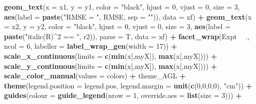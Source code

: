 \documentclass[
]{article}
\newenvironment{Shaded}{\begin{snugshade}}{\end{snugshade}}
\newcommand{\DataTypeTok}[1]{\textcolor[rgb]{0.13,0.29,0.53}{#1}}
\newcommand{\DecValTok}[1]{\textcolor[rgb]{0.00,0.00,0.81}{#1}}
\newcommand{\KeywordTok}[1]{\textcolor[rgb]{0.13,0.29,0.53}{\textbf{#1}}}
\newcommand{\NormalTok}[1]{#1}
\newcommand{\OperatorTok}[1]{\textcolor[rgb]{0.81,0.36,0.00}{\textbf{#1}}}
\newcommand{\StringTok}[1]{\textcolor[rgb]{0.31,0.60,0.02}{#1}}
\begin{document}
\begin{Shaded}
\begin{Highlighting}[]
{{{{{{{{{{\StringTok{    }\KeywordTok{geom_text}\NormalTok{(}\DataTypeTok{x =}\NormalTok{ x1, }\DataTypeTok{y =}\NormalTok{ y1, }\DataTypeTok{color =} \StringTok{"black"}\NormalTok{, }\DataTypeTok{hjust =} \DecValTok{0}\NormalTok{, }\DataTypeTok{vjust =} \DecValTok{0}\NormalTok{, }\DataTypeTok{size =} \DecValTok{3}\NormalTok{,}
              \KeywordTok{aes}\NormalTok{(}\DataTypeTok{label =} \KeywordTok{paste}\NormalTok{(}\StringTok{"RMSE = "}\NormalTok{, RMSE, }\DataTypeTok{sep =} \StringTok{""}\NormalTok{)), }\DataTypeTok{data =}\NormalTok{ xf) }\OperatorTok{+}
\StringTok{    }\KeywordTok{geom_text}\NormalTok{(}\DataTypeTok{x =}\NormalTok{ x2, }\DataTypeTok{y =}\NormalTok{ y2, }\DataTypeTok{color =} \StringTok{"black"}\NormalTok{, }\DataTypeTok{hjust =} \DecValTok{0}\NormalTok{, }\DataTypeTok{vjust =} \DecValTok{0}\NormalTok{, }\DataTypeTok{size =} \DecValTok{3}\NormalTok{,}
              \KeywordTok{aes}\NormalTok{(}\DataTypeTok{label =} \KeywordTok{paste}\NormalTok{(}\StringTok{"italic(R)^2 == "}\NormalTok{, r2)), }\DataTypeTok{parse =}\NormalTok{ T, }\DataTypeTok{data =}\NormalTok{ xf) }\OperatorTok{+}
\StringTok{    }\KeywordTok{facet_wrap}\NormalTok{(Expt }\OperatorTok{~}\StringTok{ }\NormalTok{., }\DataTypeTok{ncol =} \DecValTok{6}\NormalTok{, }\DataTypeTok{labeller =} \KeywordTok{label_wrap_gen}\NormalTok{(}\DataTypeTok{width =} \DecValTok{17}\NormalTok{)) }\OperatorTok{+}\StringTok{ }
\StringTok{    }\KeywordTok{scale_x_continuous}\NormalTok{(}\DataTypeTok{limits =} \KeywordTok{c}\NormalTok{(}\KeywordTok{min}\NormalTok{(x[,myX]), }\KeywordTok{max}\NormalTok{(x[,myX]))) }\OperatorTok{+}
\StringTok{    }\KeywordTok{scale_y_continuous}\NormalTok{(}\DataTypeTok{limits =} \KeywordTok{c}\NormalTok{(}\KeywordTok{min}\NormalTok{(x[,myX]), }\KeywordTok{max}\NormalTok{(x[,myX]))) }\OperatorTok{+}
\StringTok{    }\KeywordTok{scale_color_manual}\NormalTok{(}\DataTypeTok{values =}\NormalTok{ colors) }\OperatorTok{+}
\StringTok{    }\NormalTok{theme_AGL }\OperatorTok{+}\StringTok{ }
\StringTok{    }\KeywordTok{theme}\NormalTok{(}\DataTypeTok{legend.position =}\NormalTok{ legend.pos, }\DataTypeTok{legend.margin =} \KeywordTok{unit}\NormalTok{(}\KeywordTok{c}\NormalTok{(}\DecValTok{0}\NormalTok{,}\DecValTok{0}\NormalTok{,}\DecValTok{0}\NormalTok{,}\DecValTok{0}\NormalTok{), }\StringTok{"cm"}\NormalTok{)) }\OperatorTok{+}
\StringTok{    }\KeywordTok{guides}\NormalTok{(}\DataTypeTok{colour =} \KeywordTok{guide_legend}\NormalTok{(}\DataTypeTok{nrow =} \DecValTok{1}\NormalTok{, }\DataTypeTok{override.aes =} \KeywordTok{list}\NormalTok{(}\DataTypeTok{size =} \DecValTok{3}\NormalTok{))) }\OperatorTok{+}
}}}}}}}}}}
\end{Highlighting}
\end{Shaded}
\end{document}
